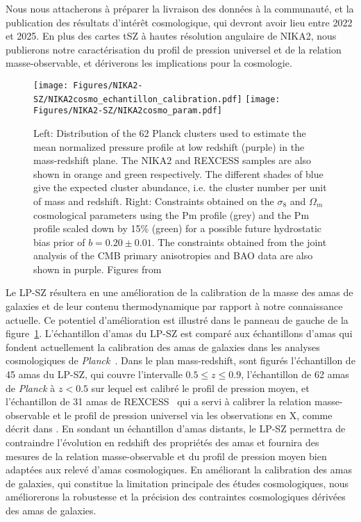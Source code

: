 Nous nous attacherons à préparer la livraison des données à la
communauté, et la publication des résultats d'intérêt cosmologique,
qui devront avoir lieu entre 2022 et 2025. En plus des cartes tSZ à hautes
résolution angulaire de NIKA2, nous publierons notre caractérisation
du profil de pression universel et de la relation masse-observable,
et dériverons les implications pour la cosmologie. 
%
\begin{figure}
  \centering
  \texttt{[image: Figures/NIKA2-SZ/NIKA2cosmo\_echantillon\_calibration.pdf]}
  \texttt{[image: Figures/NIKA2-SZ/NIKA2cosmo\_param.pdf]}
  \caption{Left: Distribution of the 62 Planck clusters used to
    estimate the mean normalized pressure profile at low redshift
    (purple) in the mass-redshift plane. The NIKA2 and REXCESS samples
    are also shown in orange and green respectively.
    The different shades of blue give the expected cluster abundance,
i.e. the cluster number per unit of mass and redshift. Right:
Constraints obtained on the $\sigma_8$ and $\Omega_m$ cosmological
parameters using the Pm profile (grey) and the Pm profile scaled down
by 15\% (green) for a possible future hydrostatic bias prior of $b = 0.20
\pm 0.01$. The constraints obtained from the joint analysis of the CMB
primary anisotropies and BAO data are also shown in purple. Figures
from~\citet{Ruppin2019b}}
  \label{fig:nika2cosmo}
\end{figure}
%
Le LP-SZ résultera en une amélioration de la calibration de la masse des
amas de galaxies et de leur contenu thermodynamique par rapport à
notre connaissance actuelle. Ce potentiel d'amélioration est illustré
dans le panneau de gauche de la
figure~\ref{fig:nika2cosmo}. L'échantillon d'amas du LP-SZ est comparé
aux échantillons d'amas qui fondent actuellement la calibration des
amas de galaxies dans les analyses cosmologiques de
\emph{Planck}~\citep{Planck_2014_SZ_Cosmo,
  Planck_2014_ymap, Planck_2016_SZ_cosmo, Planck2016_ymap,
  Salvati2018}. Dans le plan mass-redshift, sont figurés l'échantillon
de 45 amas du LP-SZ, qui couvre l'intervalle $0.5 \le z \le 0.9$,
l'échantillon de 62 amas de \emph{Planck} à $z<0.5$ sur lequel est
calibré le profil de pression moyen, et l'échantillon de 31 amas de
REXCESS~\citep{Pratt2009} qui a servi à calibrer la relation
masse-observable et le profil de pression universel via les
observations en X, comme décrit dans \citet{Arnaud2010}. En sondant un
échantillon d'amas distants,
le LP-SZ permettra de contraindre l'évolution en redshift des
propriétés des amas et fournira des mesures de la relation
masse-observable et du profil de pression moyen bien adaptées aux
relevé d'amas cosmologiques. En améliorant la calibration des amas de
galaxies, qui constitue la limitation principale des études
cosmologiques, nous améliorerons la robustesse et la précision des
contraintes cosmologiques dérivées des amas de galaxies.

